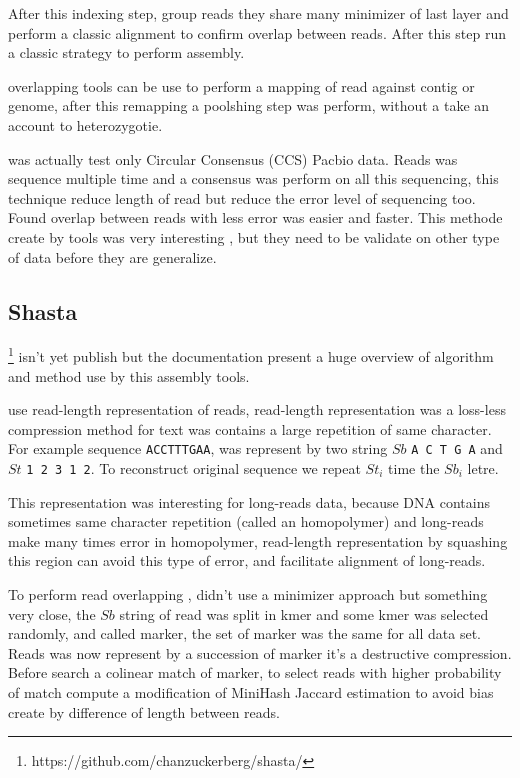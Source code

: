 \documentclass[main]{subfiles}
\begin{document}
After this indexing step, \shimmer group reads they share many minimizer of last layer and perform a classic alignment to confirm overlap between reads. After this step \peregrine run a classic \OLC strategy to perform assembly.

\shimmer overlapping tools can be use to perform a mapping of read against contig or genome, after this remapping a poolshing step was perform, without a take an account to heterozygotie.

\peregrine was actually test only Circular Consensus (CCS) Pacbio data. Reads was sequence multiple time and a consensus was perform on all this sequencing, this technique reduce length of read but reduce the error level of sequencing too. Found overlap between reads with less error was easier and faster. This methode create by \peregrine tools was very interesting , but they need to be validate on other type of data before they are generalize.

\subsection{Shasta}

\newcommand{\shasta}{}

\shasta\footnote{https://github.com/chanzuckerberg/shasta/} isn't yet publish but the documentation present a huge overview of algorithm and method use by this assembly tools.

\shasta use read-length representation of reads, read-length representation was a loss-less compression method for text was contains a large repetition of same character. For example sequence \texttt{ACCTTTGAA}, was represent by two string $Sb$ \texttt{A C T G A} and $St$ \texttt{1 2 3 1 2}. To reconstruct original sequence we repeat $St_i$ time the $Sb_i$ letre.

This representation was interesting for long-reads data, because DNA contains sometimes same character repetition (called an homopolymer) and long-reads make many times error in homopolymer, read-length representation by squashing this region can avoid this type of error, and facilitate alignment of long-reads.

To perform read overlapping \shasta, didn't use a minimizer approach but something very close, the $Sb$ string of read was split in kmer and some kmer was selected randomly, and called marker, the set of marker was the same for all data set. Reads was now represent by a succession of marker it's a destructive compression. 
Before search a colinear match of marker, to select reads with higher probability of match \shasta compute a modification of MiniHash Jaccard estimation  to avoid bias create by difference of length between reads.
\end{document}
